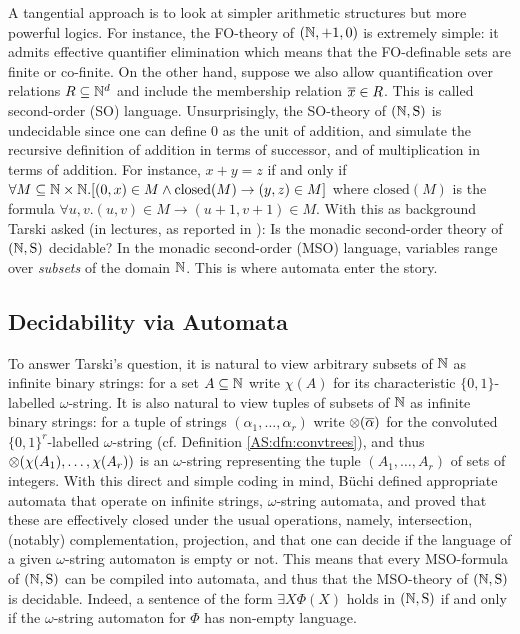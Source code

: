 
A tangential approach is to look at simpler arithmetic structures but more powerful logics. For instance, the FO-theory of $(\mathbb{N},+1,0)$ is extremely simple: it admits effective quantifier elimination which means that the FO-definable sets are finite or co-finite. On the other hand, suppose we also allow quantification over relations $R \subseteq \mathbb{N}^d$ and include the membership relation $\mbox{$\overline {x}$} \in R$.  This is called second-order (SO) language. Unsurprisingly, the SO-theory of $\mbox{$(\mathbb{N},\mathrm{S})$}$ is undecidable since one can define $0$ as the unit of addition, and simulate the recursive definition of addition in terms of successor, and of multiplication in terms of addition. For instance, $x + y = z $ if and only if $\forall M \subseteq \mathbb{N} \times \mathbb{N}. [(0,x) \in M \wedge \text{closed}(M) \to (y,z) \in M]$ where $\text{closed}(M)$ is the formula $\forall u,v. (u,v) \in M \to (u+1,v+1) \in M$. With this as background Tarski asked (in lectures, as reported in \cite{Robi58}): Is the monadic second-order theory of $\mbox{$(\mathbb{N},\mathrm{S})$}$ decidable? In the monadic second-order (MSO) language, variables range over
{\em subsets} of the domain $\mathbb{N}$. This is where automata enter the story.




\subsection{Decidability via Automata}

To answer Tarski's question, it is natural to view arbitrary subsets of $\mathbb{N}$ as infinite binary strings: for a set $A \subseteq \mathbb{N}$ write $\chi(A)$ for its characteristic $\{0,1\}$-labelled $\omega$-string. It is also natural to view tuples of subsets of $\mathbb{N}$ as infinite binary strings: for a tuple of strings $(\alpha_1,\dots,\alpha_r)$ write $\otimes(\mbox{$\overline {\alpha}$})$ for the convoluted $\{0,1\}^r$-labelled $\omega$-string (cf. Definition \ref{AS:dfn:convtrees}), and thus $\otimes(\chi(A_1), \dots, \chi(A_r))$ is an $\omega$-string representing the tuple $(A_1,\dots,A_r)$ of sets of integers. With this direct and simple coding in mind, B\"uchi \cite{Buch62} defined appropriate automata that operate on infinite strings, $\omega$-string automata, and proved that these are effectively closed under the usual operations, namely, intersection, (notably) complementation, projection, and that one can decide if the language of a given $\omega$-string automaton is empty or not. This means that every MSO-formula of $\mbox{$(\mathbb{N},\mathrm{S})$}$ can be compiled into automata, and thus that the MSO-theory of $\mbox{$(\mathbb{N},\mathrm{S})$}$ is decidable. Indeed, a sentence of the form $\exists X \Phi(X)$ holds in $\mbox{$(\mathbb{N},\mathrm{S})$}$ if and only if the $\omega$-string automaton for $\Phi$ has non-empty language.


